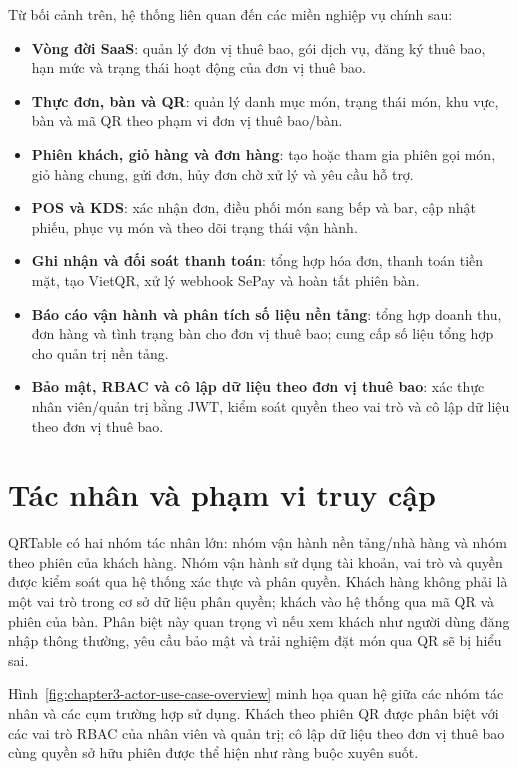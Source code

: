 Từ bối cảnh trên, hệ thống liên quan đến các miền nghiệp vụ chính sau:

\begin{itemize}
  \item \textbf{Vòng đời SaaS}: quản lý đơn vị thuê bao, gói dịch vụ, đăng ký thuê bao, hạn mức và trạng thái hoạt động của đơn vị thuê bao.
  \item \textbf{Thực đơn, bàn và QR}: quản lý danh mục món, trạng thái món, khu vực, bàn và mã QR theo phạm vi đơn vị thuê bao/bàn.
  \item \textbf{Phiên khách, giỏ hàng và đơn hàng}: tạo hoặc tham gia phiên gọi món, giỏ hàng chung, gửi đơn, hủy đơn chờ xử lý và yêu cầu hỗ trợ.
  \item \textbf{POS và KDS}: xác nhận đơn, điều phối món sang bếp và bar, cập nhật phiếu, phục vụ món và theo dõi trạng thái vận hành.
  \item \textbf{Ghi nhận và đối soát thanh toán}: tổng hợp hóa đơn, thanh toán tiền mặt, tạo VietQR, xử lý webhook SePay và hoàn tất phiên bàn.
  \item \textbf{Báo cáo vận hành và phân tích số liệu nền tảng}: tổng hợp doanh thu, đơn hàng và tình trạng bàn cho đơn vị thuê bao; cung cấp số liệu tổng hợp cho quản trị nền tảng.
  \item \textbf{Bảo mật, RBAC và cô lập dữ liệu theo đơn vị thuê bao}: xác thực nhân viên/quản trị bằng JWT, kiểm soát quyền theo vai trò và cô lập dữ liệu theo đơn vị thuê bao.
\end{itemize}

\section{Tác nhân và phạm vi truy cập}

QRTable có hai nhóm tác nhân lớn: nhóm vận hành nền tảng/nhà hàng và nhóm theo phiên của khách hàng. Nhóm vận hành sử dụng tài khoản, vai trò và quyền được kiểm soát qua hệ thống xác thực và phân quyền. Khách hàng không phải là một vai trò trong cơ sở dữ liệu phân quyền; khách vào hệ thống qua mã QR và phiên của bàn. Phân biệt này quan trọng vì nếu xem khách như người dùng đăng nhập thông thường, yêu cầu bảo mật và trải nghiệm đặt món qua QR sẽ bị hiểu sai.

Hình~\ref{fig:chapter3-actor-use-case-overview} minh họa quan hệ giữa các nhóm tác nhân và các cụm trường hợp sử dụng. Khách theo phiên QR được phân biệt với các vai trò RBAC của nhân viên và quản trị; cô lập dữ liệu theo đơn vị thuê bao cùng quyền sở hữu phiên được thể hiện như ràng buộc xuyên suốt.

